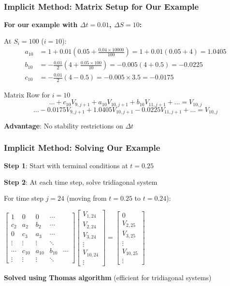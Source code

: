 \documentclass[aspectratio=169]{beamer}
\begin{document}
\begin{frame}
\frametitle{Implicit Method: Matrix Setup for Our Example}
\textbf{For our example with \(\Delta t = 0.01\), \(\Delta S = 10\):}

At \(S_i = 100\) (\(i = 10\)):
\begin{align}
a_{10} &= 1 + 0.01(0.05 + \frac{0.04 \times 10000}{100}) = 1 + 0.01(0.05 + 4) = 1.0405 \\
b_{10} &= -\frac{0.01}{2}(4 + \frac{0.05 \times 100}{10}) = -0.005(4 + 0.5) = -0.0225 \\
c_{10} &= -\frac{0.01}{2}(4 - 0.5) = -0.005 \times 3.5 = -0.0175
\end{align}

\begin{block}{Matrix Row for \(i = 10\)}
\[\ldots + c_{10} V_{9,j+1} + a_{10} V_{10,j+1} + b_{10} V_{11,j+1} + \ldots = V_{10,j}\]
\[\ldots - 0.0175 V_{9,j+1} + 1.0405 V_{10,j+1} - 0.0225 V_{11,j+1} + \ldots = V_{10,j}\]
\end{block}

\textbf{Advantage}: No stability restrictions on \(\Delta t\)
\end{frame}

\begin{frame}
\frametitle{Implicit Method: Solving Our Example}
\textbf{Step 1}: Start with terminal conditions at \(t = 0.25\)

\textbf{Step 2}: At each time step, solve tridiagonal system

For time step \(j = 24\) (moving from \(t = 0.25\) to \(t = 0.24\)):

\begin{center}
\small
\(\begin{bmatrix}
1 & 0 & 0 & \cdots \\
c_2 & a_2 & b_2 & \cdots \\
0 & c_3 & a_3 & \cdots \\
\vdots & \vdots & \vdots & \ddots \\
\cdots & c_{10} & a_{10} & b_{10} & \cdots \\
\vdots & \vdots & \vdots & \ddots
\end{bmatrix}
\begin{bmatrix}
V_{1,24} \\
V_{2,24} \\
V_{3,24} \\
\vdots \\
V_{10,24} \\
\vdots
\end{bmatrix}
=
\begin{bmatrix}
0 \\
V_{2,25} \\
V_{3,25} \\
\vdots \\
V_{10,25} \\
\vdots
\end{bmatrix}\)
\end{center}

\textbf{Solved using Thomas algorithm} (efficient for tridiagonal systems)
\end{frame}
\end{document}
